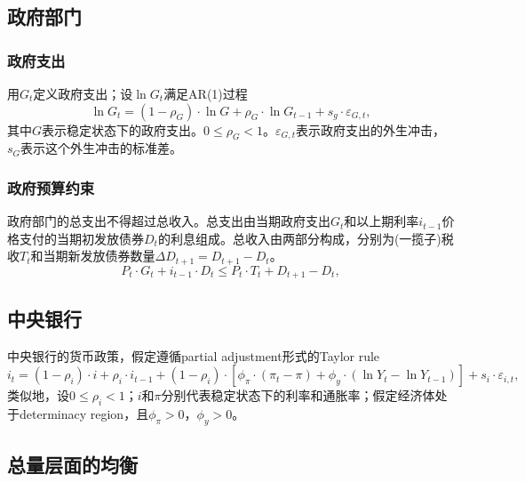 \subsection{政府部门}
\label{sec:Gov-spending}

\subsubsection{政府支出}
用$G_t$定义政府支出；设$\ln G_t$满足AR(1)过程
\begin{equation}
\label{eq:MS-gov-spending-ln}
\ln G_t = (1-\rho_G) \cdot \ln G + \rho_G \cdot \ln G_{t-1} + s_g \cdot \varepsilon_{G,t},
\end{equation}
其中$G$表示稳定状态下的政府支出。$0 \le \rho_G <1$。$\varepsilon_{G,t}$表示政府支出的外生冲击，$s_G$表示这个外生冲击的标准差。

\subsubsection{政府预算约束}
政府部门的总支出不得超过总收入。总支出由当期政府支出$G_t$和以上期利率$i_{t-1}$价格支付的当期初发放债券$D_t$的利息组成。总收入由两部分构成，分别为(一揽子)税收$T_t$和当期新发放债券数量$\Delta D_{t+1} = D_{t+1}-D_{t}$。
\begin{equation}
\label{eq:MS-gov-budget-constraint}
P_t \cdot G_t + i_{t-1} \cdot D_t \le P_t \cdot T_t + D_{t+1} - D_t,
\end{equation}

\subsection{中央银行}
中央银行的货币政策，假定遵循partial adjustment形式的Taylor rule
\begin{equation}
\label{eq:MS-MP-taylor-rule-partial-adjust}
i_t = \left( 1 - \rho_{i} \right) \cdot i + \rho_i \cdot i_{t-1} + \left( 1 - \rho_{i} \right) \cdot \left[
\phi_\pi \cdot \left(\pi_t - \pi \right)
+ \phi_y \cdot
\left(
\ln Y_t - \ln Y_{t-1}
\right)
\right]
+ s_i \cdot \varepsilon_{i,t},
\end{equation}
类似地，设$0 \le \rho_i < 1$；$i$和$\pi$分别代表稳定状态下的利率和通胀率；假定经济体处于determinacy region，且$\phi_\pi > 0$，$\phi_{y} >0$。

\subsection{总量层面的均衡}

